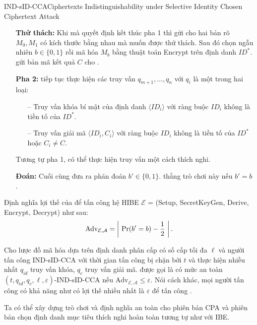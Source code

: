 \documentclass[class=report, crop=false]{standalone}
\begin{document}
\begin{game}{IND-sID-CCA}{Ciphertexts Indistinguishability under Selective Identity Chosen Ciphertext Attack}
\begin{itemize}[leftmargin=1.5cm, itemindent=-0.5cm]
					\item[] \textbf{Thử thách:} Khi mà \adversary quyết định kết thúc pha 1 thì \adversary gửi cho \challenger hai bản rõ $M_0, M_1$ có kích thước bằng nhau mà \adversary muốn được thử thách. Sau đó \challenger chọn ngẫu nhiên $b \in \{0, 1\}$ rồi mã hóa $M_b$ bằng thuật toán \textsf{Encrypt} trên định danh $ID^*$. \challenger gửi bản mã kết quả $C$ cho \adversary.
					\item[] \textbf{Pha 2:} \adversary tiếp tục thực hiện các truy vấn $q_{m + 1}, ..., q_{n}$ với $q_i$ là một trong hai loại:
					\begin{itemize}
						\item[--] Truy vấn khóa bí mật của định danh $\langle ID_i \rangle$ với ràng buộc $ID_i$ không là tiền tố của $ID^*$.
						\item[--] Truy vấn giải mã $\langle ID_i, C_i \rangle$ với ràng buộc $ID_i$ không là tiền tố của $ID^*$ hoặc $C_i \neq C$.
					\end{itemize}
					Tương tự pha 1, \adversary có thể thực hiện truy vấn một cách thích nghi.
					\item[] \textbf{Đoán:} Cuối cùng \adversary đưa ra phán đoán $b' \in \{0, 1\}$. \adversary thắng trò chơi này nếu $b' = b$.
				\end{itemize}
				\vspace{-\baselineskip}
				Định nghĩa lợi thế của \adversary để tấn công hệ HIBE $\mathcal{E}$ = (\textsf{Setup, SecretKeyGen, Derive, Encrypt, Decrypt}) như sau:
				\[
					\text{Adv}_{\mathcal{E, A}} = \left| \ \text{Pr}(b' = b) - \frac{1}{2} \ \right|.
				\]
			\end{game}
			\begin{definition}
				Cho lược đồ mã hóa dựa trên định danh phân cấp \scheme có số cấp tối đa $\ell$ và người tấn công IND-sID-CCA \adversary với thời gian tấn công bị chặn bởi $t$ và thực hiện nhiều nhất $q_{id}$ truy vấn khóa, $q_c$ truy vấn giải mã. \scheme được gọi là có mức an toàn $(t, q_{id}, q_c, \ell, \varepsilon)$-IND-sID-CCA nếu $\text{Adv}_{\mathcal{E, A}} \leq \varepsilon$. Nói cách khác, mọi người tấn công có khả năng như \adversary có lợi thế nhiều nhất là $\varepsilon$ để tấn công \scheme.
			\end{definition}
			Ta có thể xây dựng trò chơi và định nghĩa an toàn cho phiên bản CPA và phiên bản chọn định danh mục tiêu thích nghi hoàn toàn tương tự như với IBE.
\end{document}
